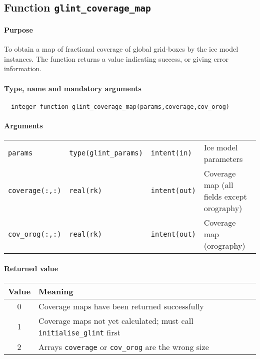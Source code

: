 \subsection{Function \texttt{glint\_coverage\_map}}
%
\paragraph{Purpose} To obtain a map of fractional coverage of global
grid-boxes by the ice model instances. The function returns a value
indicating success, or giving error information.
%
\paragraph{Type, name and mandatory arguments}
%
\begin{verbatim}
  integer function glint_coverage_map(params,coverage,cov_orog)
\end{verbatim}
%
\paragraph{Arguments}
%
\begin{center}
  \tablefirsthead{%
    \hline
  } 
      \tablelasttail{\hline}
        \begin{supertabular}{lllp{5.5cm}}
        \texttt{params} & \texttt{type(glint\_params)} & \texttt{intent(in)} & Ice model parameters \\
\texttt{coverage(:,:)} & \texttt{real(rk)} & \texttt{intent(out)} & Coverage
map (all fields except orography) \\
\texttt{cov\_orog(:,:)} & \texttt{real(rk)} & \texttt{intent(out)} & Coverage
map (orography) \\
\end{supertabular}
\end{center}
%
\paragraph{Returned value}
%
\begin{center}
\begin{tabular}{cl}
\hline
Value & Meaning \\
\hline
\hline
0 & Coverage maps have been returned successfully \\
1 & Coverage maps not yet calculated; must call \texttt{initialise\_glint}
first \\
2 & Arrays \texttt{coverage} or \texttt{cov\_orog} are the wrong size \\
\hline
\end{tabular}
\end{center}
